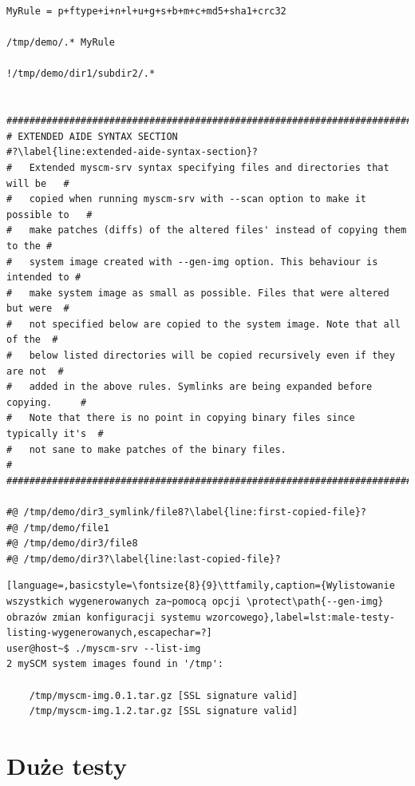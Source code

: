 \documentclass[thesis]{subfiles}
\begin{document}
\begin{lstlisting}
MyRule = p+ftype+i+n+l+u+g+s+b+m+c+md5+sha1+crc32

/tmp/demo/.* MyRule

!/tmp/demo/dir1/subdir2/.*


###############################################################################
# EXTENDED AIDE SYNTAX SECTION                                                #?\label{line:extended-aide-syntax-section}?
#   Extended myscm-srv syntax specifying files and directories that will be   #
#   copied when running myscm-srv with --scan option to make it possible to   #
#   make patches (diffs) of the altered files' instead of copying them to the #
#   system image created with --gen-img option. This behaviour is intended to #
#   make system image as small as possible. Files that were altered but were  #
#   not specified below are copied to the system image. Note that all of the  #
#   below listed directories will be copied recursively even if they are not  #
#   added in the above rules. Symlinks are being expanded before copying.     #
#   Note that there is no point in copying binary files since typically it's  #
#   not sane to make patches of the binary files.                             #
###############################################################################

#@ /tmp/demo/dir3_symlink/file8?\label{line:first-copied-file}?
#@ /tmp/demo/file1
#@ /tmp/demo/dir3/file8
#@ /tmp/demo/dir3?\label{line:last-copied-file}?
\end{lstlisting}
\label{male-testy-plik-konfiguracyjny-last-page} %

\begin{minipage}{\linewidth}
\begin{lstlisting}[language=,basicstyle=\fontsize{8}{9}\ttfamily,caption={Wylistowanie wszystkich wygenerowanych za~pomocą opcji \protect\path{--gen-img} obrazów zmian konfiguracji systemu wzorcowego},label=lst:male-testy-listing-wygenerowanych,escapechar=?]
user@host~$ ./myscm-srv --list-img
2 mySCM system images found in '/tmp':

    /tmp/myscm-img.0.1.tar.gz [SSL signature valid]
    /tmp/myscm-img.1.2.tar.gz [SSL signature valid]
\end{lstlisting}
\end{minipage}


\section{Duże testy}
\label{sec:duze-testy}
\end{document}
